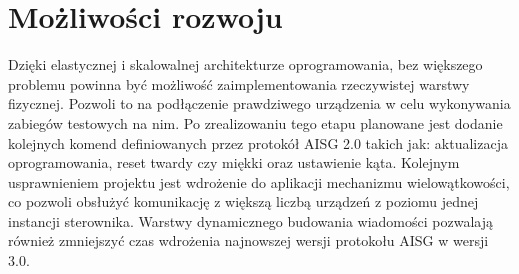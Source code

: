     \section{Możliwości rozwoju}
    Dzięki elastycznej i skalowalnej architekturze oprogramowania, bez większego problemu powinna być możliwość zaimplementowania rzeczywistej
    warstwy fizycznej. Pozwoli to na podłączenie prawdziwego urządzenia w celu wykonywania zabiegów testowych na nim. Po zrealizowaniu
    tego etapu planowane jest dodanie kolejnych komend definiowanych przez protokół AISG 2.0 takich jak: aktualizacja oprogramowania, 
    reset twardy czy miękki oraz ustawienie kąta. Kolejnym usprawnieniem projektu jest wdrożenie do aplikacji mechanizmu wielowątkowości,
    co pozwoli obsłużyć komunikację z większą liczbą urządzeń z poziomu jednej instancji sterownika.
    Warstwy dynamicznego budowania wiadomości pozwalają również zmniejszyć czas wdrożenia najnowszej wersji protokołu AISG w wersji 3.0.

\let\cleardoublepage\clearpage